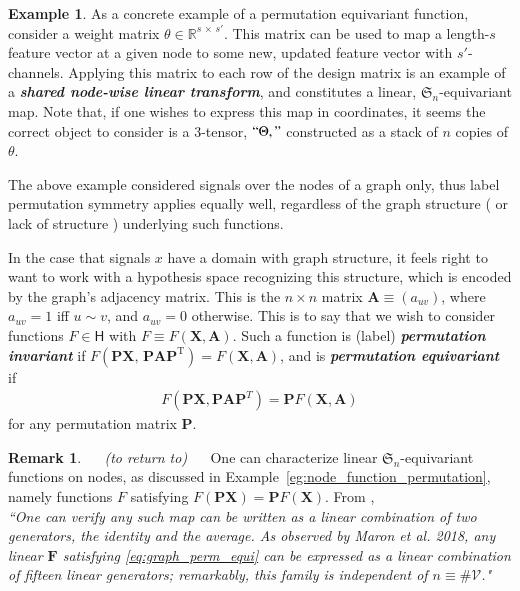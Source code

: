 \documentclass[12pt]{article}
\numberwithin{equation}{section}
\theoremstyle{definition}
\newtheorem{rmk}[thm]{Remark}
\newtheorem{eg}{Example}
\newcommand{		\B		}	{\textbf					} %
\newcommand{		\1		}	{	\bm{1}					}%
\begin{document}
\begin{mdframed}
\begin{eg}
As a concrete example of a permutation equivariant function, consider a weight matrix $\theta \in \mathbb{R}^{s \, \times \, s'}$. This matrix can be used to map a length-$s$ feature vector at a given node to some new, updated feature vector with $s'$-channels. Applying this matrix to each row of the design matrix is an example of a \emph{\B{shared node-wise linear transform}}, and constitutes a linear, $\mathfrak{S}_n$-equivariant map. Note that, if one wishes to express this map in coordinates, it seems the correct object to consider is a $3$-tensor, $``\Theta,"$ constructed as a stack of $n$ copies of $\theta$.
\end{eg}
\end{mdframed}

\vspace{5mm}

The above example considered signals over the nodes of a graph only, thus label permutation symmetry applies equally well, regardless of the graph structure ( or lack of structure ) underlying such functions. 

In the case that signals $x$ have a domain with graph structure, it feels right to want to work with a hypothesis space recognizing this structure, which is encoded by the graph's adjacency matrix. This is the $n \times n$ matrix $\bm{A} \equiv (a_{uv})$, where $a_{uv} = 1$ iff $u \sim v$, and $a_{uv} = 0$ otherwise. This is to say that we wish to consider functions $F \in \textsf{H}$ with $F \equiv F( \bm{X}, \bm{A} )$. Such a function is (label) \emph{\B{permutation invariant}} if $F( \bm{P} \bm{X},\, \bm{P} \bm{A} \bm{P}^{\textrm{T}} ) = F ( \bm{X}, \bm{A})$, and is  \emph{\B{permutation equivariant}} if
\begin{align}
\label{eq:graph_perm_equi}
F( \bm{P} \bm{X}, \bm{P} \bm{A} \bm{P}^T ) = \bm{P}F( \bm{X}, \bm{A})
\end{align}
for any permutation matrix $\bm{P}$. 

\begin{rmk} $\quad$ \emph{(to return to)} $\quad$ One can characterize linear $\mathfrak{S}_n$-equivariant functions on nodes, as discussed in Example~\ref{eg:node_function_permutation}, namely functions $F$ satisfying $F (\bm{P} \bm{X}) = \bm{P} F ( \bm{X} )$. From \cite{BBCV21},  \\

\subitem \emph{``One can verify any such map can be written as a linear combination of two generators, the identity and the average. As observed by Maron et al. 2018, any linear  $\mathbf{F}$ satisfying \eqref{eq:graph_perm_equi} can be expressed as a linear combination of fifteen linear generators; remarkably, this family is independent of $n \equiv \# \mathcal{V}$."}

\end{rmk}
\end{document}

